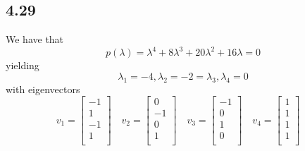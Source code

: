 \documentclass[letterpaper,12pt]{article}
\theoremstyle{definition}
\begin{document}
\subsection*{4.29}

We have that
 \[ p(\lambda) = \lambda^4 + 8\lambda^3 + 20\lambda^2 + 16\lambda = 0\] yielding \[\lambda_1 = -4, \lambda_2 = -2 = \lambda_3, \lambda_4 = 0\]
with eigenvectors
\[v_1 = \begin{bmatrix}-1 \\
                 1 \\
                 -1\\
                 1\\
\end{bmatrix} \quad
v_2 = \begin{bmatrix}0 \\
                 -1 \\
                 0\\
                 1\\
\end{bmatrix} \quad
v_3 = \begin{bmatrix}-1 \\
                 0 \\
                 1\\
                 0\\
\end{bmatrix} \quad
v_4 = \begin{bmatrix}1 \\
                 1 \\
                 1\\
                 1\\
\end{bmatrix} \quad\]
\end{document}
